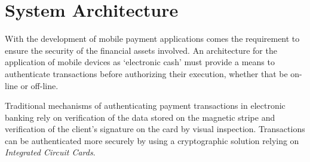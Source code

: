 \section{System Architecture}
\label{chap:hardware_architecture}
With the development of mobile payment applications comes the requirement to ensure the security of the financial assets involved.
An architecture for the application of mobile devices as `electronic cash' must provide a means to authenticate transactions before authorizing their execution, whether that be on-line or off-line.


Traditional mechanisms of authenticating payment transactions in electronic banking rely on verification of the data stored on the magnetic stripe and verification of the client's signature on the card by visual inspection.
Transactions can be authenticated more securely by using a cryptographic solution relying on \textit{Integrated Circuit Cards}.

